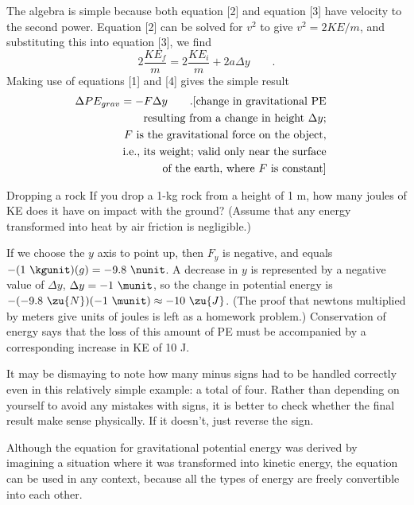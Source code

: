 The algebra is simple because both equation [2] and
equation [3] have velocity to the second power. Equation [2]
can be solved for $v^2$ to give $v^2 = 2KE/m$, and
substituting this into equation [3], we find
\begin{equation*}
                2\frac{KE_f}{m}  =  2\frac{KE_i}{m} + 2a\Delta y   \qquad   .
\end{equation*}
Making use of equations [1] and [4] gives the simple result
\begin{multline*}
                \Delta PE_{grav}  =  -F\Delta y   \qquad   . \hfill
\shoveright{\text{[change in  gravitational PE}}\\
\shoveright{\text{resulting from a change in height $\Delta y$;}}\\
\shoveright{\text{$F$ is the gravitational force on the object,}}\\
\shoveright{\text{i.e., its weight; valid only near the surface}}\\
\shoveright{\text{of the earth, where $F$ is constant]}}\\
\end{multline*}

\begin{eg}{Dropping a rock}
\egquestion If you drop a 1-kg rock from a height of 1 m,
how many joules of KE does it have on impact with the
ground? (Assume that any energy transformed into heat by air
friction is negligible.)

\eganswer If we choose the $y$ axis to point up, then $F_y$
is negative, and equals $-(1\ \kgunit)(g)=-9.8\ \nunit$. A decrease
in $y$ is represented by a negative value of $\Delta y$,
$\Delta y=-1\ \munit$, so the change in potential energy is
$-(-9.8\ \zu{N})(-1\ \munit)\approx-10\ \zu{J}$. (The proof that newtons
multiplied by meters give units of joules is left as a
homework problem.) Conservation of energy says that the loss
of this amount of PE must be accompanied by a corresponding
increase in KE of 10 J.
\end{eg}

It may be dismaying to note how many minus signs had to be
handled correctly even in this relatively simple example: a
total of four. Rather than depending on yourself to avoid
any mistakes with signs, it is better to check whether the
final result make sense physically. If it doesn't,
just reverse the sign.

Although the equation for gravitational potential energy was
derived by imagining a situation where it was transformed
into kinetic energy, the equation can be used in any
context, because all the types of energy are freely
convertible into each other.

